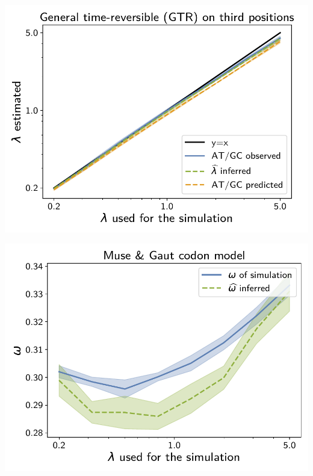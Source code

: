 \documentclass{article}
\begin{document}
\begin{center}
    \begin{minipage}{0.325\linewidth}
        \includegraphics[width=\linewidth, page=1]{inference_supp_mat/PrimatesExons10Mu2.0_lambda_GTR.pdf}
    \end{minipage}
    \hfill
    \begin{minipage}{0.325\linewidth}
        \includegraphics[width=\linewidth, page=1]{inference_supp_mat/PrimatesExons10Mu2.0_omega_MG.pdf}
    \end{minipage}
    \begin{minipage}{0.325\linewidth}

\end{minipage}
\end{center}
\end{document}
